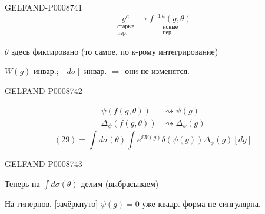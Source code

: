 \begin{GelfandAdjacentEvidence}{GELFAND-P000874}{1}
\begin{equation*}
\underset{\substack{\text{старые}\\\text{пер.}}}{g^a}
\longrightarrow
\underset{\substack{\text{новые}\\\text{пер.}}}{f^{-1\,a}(g,\theta)}
\tag{29}
\end{equation*}

$\theta$ здесь фиксировано (то самое, по к-рому интегрирование)

$W(g)$ инвар.; $[d\sigma]$ инвар. $\Rightarrow$ они не изменятся.
\end{GelfandAdjacentEvidence}
\begin{GelfandAdjacentEvidence}{GELFAND-P000874}{2}

\[
\begin{aligned}
\psi(f(g,\theta))&\rightsquigarrow\psi(g)\\
\Delta_\psi(f(g,\theta))&\rightsquigarrow\Delta_\psi(g)
\end{aligned}
\]
\begin{equation*}
(29)=\int d\sigma(\theta)\int e^{iW(g)}\delta(\psi(g))\Delta_\psi(g)[dg]
\tag*{\((30):\)}
\end{equation*}
\end{GelfandAdjacentEvidence}
\begin{GelfandAdjacentEvidence}{GELFAND-P000874}{3}


Теперь на $\int d\sigma(\theta)$ делим (выбрасываем)

На гиперпов. [зачёркнуто] $\psi(g)=0$ уже квадр. форма не сингулярна.
\end{GelfandAdjacentEvidence}
